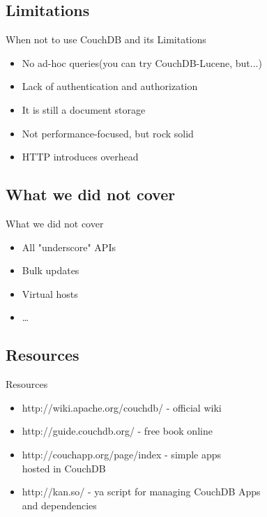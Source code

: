 \documentclass{beamer}
\begin{document}
\subsection{Limitations}
\begin{frame}{When not to use CouchDB and its Limitations}
  \begin{itemize}
    \item No ad-hoc queries(you can try CouchDB-Lucene, but...)
    \item Lack of authentication and authorization
    \item It is still a document storage
    \item Not performance-focused, but rock solid
    \item HTTP introduces overhead
  \end{itemize}
\end{frame}

\subsection{What we did not cover}
\begin{frame}{What we did not cover}
  \begin{itemize}
    \item All "underscore" APIs
    \item Bulk updates
    \item Virtual hosts
    \item \ldots
  \end{itemize}
\end{frame}

\subsection{Resources}
\begin{frame}{Resources}
  \begin{itemize}
    \item http://wiki.apache.org/couchdb/ - official wiki
    \item http://guide.couchdb.org/ - free book online
    \item http://couchapp.org/page/index - simple apps\\hosted in CouchDB
    \item http://kan.so/ - ya script for managing CouchDB Apps\\and dependencies
  \end{itemize}
\end{frame}
\end{document}

